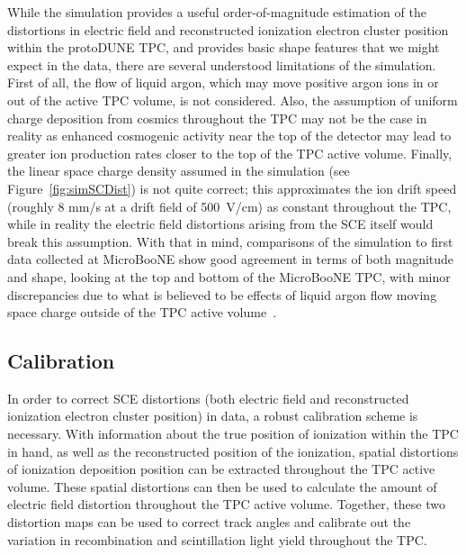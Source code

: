 While the simulation provides a useful order-of-magnitude estimation of the distortions in electric field and reconstructed ionization electron cluster position within the protoDUNE TPC, and provides basic shape features that we might expect in the data, there are several understood limitations of the simulation.  First of all, the flow of liquid argon, which may move positive argon ions in or out of the active TPC volume, is not considered.  Also, the assumption of uniform charge deposition from cosmics throughout the TPC may not be the case in reality as enhanced cosmogenic activity near the top of the detector may lead to greater ion production rates closer to the top of the TPC active volume.  Finally, the linear space charge density assumed in the simulation (see Figure~\ref{fig:simSCDist}) is not quite correct; this approximates the ion drift speed (roughly 8 mm/s at a drift field of 500~V/cm) as constant throughout the TPC, while in reality the electric field distortions arising from the SCE itself would break this assumption.  With that in mind, comparisons of the simulation to first data collected at MicroBooNE show good agreement in terms of both magnitude and shape, looking at the top and bottom of the MicroBooNE TPC, with minor discrepancies due to what is believed to be effects of liquid argon flow moving space charge outside of the TPC active volume~\cite{SCEnoteMicroBooNE}.

\subsection{Calibration} \label{sec:SCEcalib}

In order to correct SCE distortions (both electric field and reconstructed ionization electron cluster position) in data, a robust calibration scheme is necessary.  With information about the true position of ionization within the TPC in hand, as well as the reconstructed position of the ionization, spatial distortions of ionization deposition position can be extracted throughout the TPC active volume.  These spatial distortions can then be used to calculate the amount of electric field distortion throughout the TPC active volume.  Together, these two distortion maps can be used to correct track angles and calibrate out the variation in recombination and scintillation light yield throughout the TPC.

